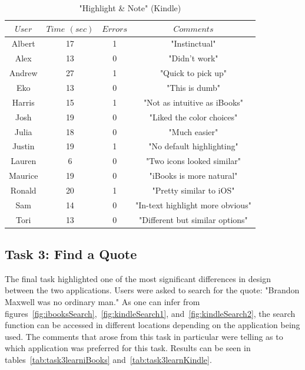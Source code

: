 \documentclass[journal, a4paper]{IEEEtran}
\begin{document}
    \begin{table}[!hbt]
		\begin{center}
		\caption{"Highlight \& Note" (Kindle)}
		\label{tab:task2learnKindle}
		\begin{tabular}{|c|c|c|c|}
			\hline
			$User$ & $Time$ $(sec)$ & $Errors$ & $Comments$\\
			\hline
            Albert & 17 & 1 & "Instinctual"\\
			\hline
			Alex & 13 & 0 & "Didn't work"\\
			\hline
            Andrew & 27 & 1 & "Quick to pick up"\\
			\hline
			Eko & 13 & 0 & "This is dumb"\\
			\hline
            Harris & 15 & 1 & "Not as intuitive as iBooks"\\
			\hline
			Josh & 19 & 0 & "Liked the color choices"\\
			\hline
            Julia & 18 & 0 & "Much easier"\\
			\hline
            Justin & 19 & 1 & "No default highlighting"\\
			\hline
            Lauren & 6 & 0 & "Two icons looked similar"\\
			\hline
            Maurice & 19 & 0 & "iBooks is more natural"\\
			\hline
            Ronald & 20 & 1 & "Pretty similar to iOS"\\
			\hline
            Sam & 14 & 0 & "In-text highlight more obvious"\\
			\hline
            Tori & 13 & 0 & "Different but similar options"\\
			\hline
		\end{tabular}
		\end{center}
	\end{table}
    
\subsection{Task 3: Find a Quote}
	The final task highlighted one of the most significant differences in design between the two applications. Users were asked to search for the quote: "Brandon Maxwell was no ordinary man." As one can infer from figures~\ref{fig:ibooksSearch},~\ref{fig:kindleSearch1}, and~\ref{fig:kindleSearch2}, the search function can be accessed in different locations depending on the application being used. The comments that arose from this task in particular were telling as to which application was preferred for this task. Results can be seen in tables~\ref{tab:task3learniBooks} and~\ref{tab:task3learnKindle}.
    
\end{document}
